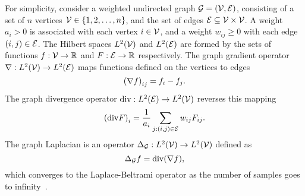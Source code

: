 For simplicity, consider a weighted undirected graph \(\mathcal{G} = (\mathcal{V}, \mathcal{E})\), consisting of a set of \(n\) vertices \(\mathcal{V} \in \{1,2,\ldots,n\}\), and the set of edges \(\mathcal{E} \subseteq \mathcal{V} \times \mathcal{V}{}\).
A weight \(a_{i} > 0\) is associated with each vertex \(i \in \mathcal{V}{}\), and a weight \(w_{i j} \geq 0\) with each edge \((i,j) \in \mathcal{E}{}\).
The Hilbert spaces \(L^{2}(\mathcal{V})\) and \(L^{2}(\mathcal{E})\) are formed by the sets of functions \(f: \mathcal{V} \to \mathbb{R}\) and \(F: \mathcal{E} \to \mathbb{R}\) respectively.
The graph gradient operator \(\nabla: L^{2}(\mathcal{V}) \to L^{2}(\mathcal{E})\) maps functions defined on the vertices to edges
%
\begin{equation}\label{eq:chapter5_graph_grad}
	{(\nabla f)}_{i j}
	= f_{i} - f_{j}.
\end{equation}
%
The graph divergence operator \(\text{div}: L^{2}(\mathcal{E}) \to L^{2}(\mathcal{V})\) reverses this mapping
%
\begin{equation}\label{eq:chapter5_graph_div}
	{(\text{div}F)}_{i}
	= \frac{1}{a_{i}} \sum\limits_{j : (i,j) \in \mathcal{E}} w_{i j} F_{i j}.
\end{equation}
%
The graph Laplacian is an operator \(\Delta_{\mathcal{G}} : L^{2}(\mathcal{V}) \to L^{2}(\mathcal{V})\) defined as
%
\begin{equation}\label{eq:chapter5_graph_laplace}
	\Delta_{\mathcal{G}} f
	= \text{div}(\nabla f),
\end{equation}
%
which converges to the Laplace-Beltrami operator as the number of samples goes to infinity~\cite{Belkin2007}.

